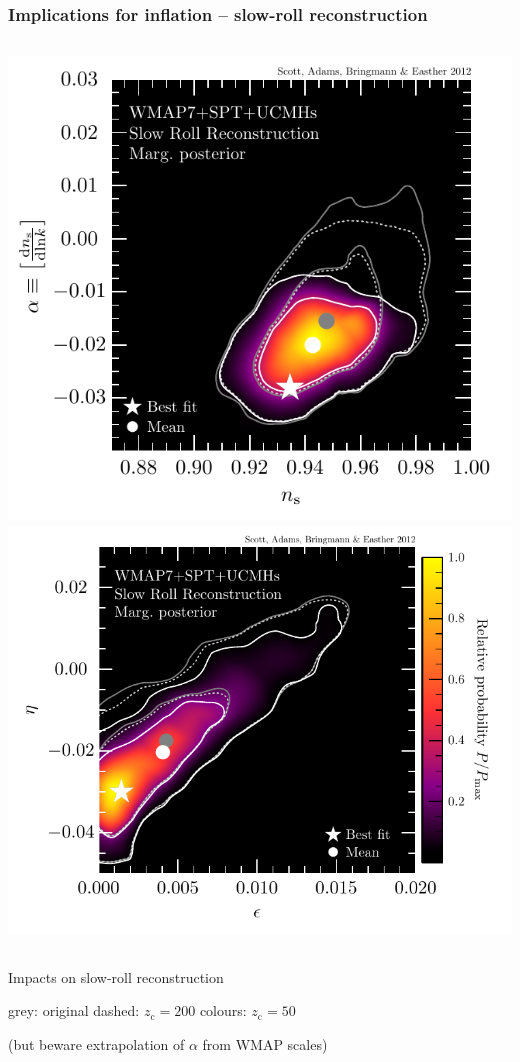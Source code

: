 \documentclass[xcolor=dvipsnames]{beamer}
\begin{document}
\begin{frame}
  \frametitle{Implications for inflation -- slow-roll reconstruction}

  \begin{columns}
    \includegraphics[height=0.9\columnwidth]{slowroll1}
    \includegraphics[height=0.9\columnwidth]{slowroll2}
  \end{columns}

  Impacts on slow-roll reconstruction

  grey: original\hspace{5mm} dashed: $z_\mathrm{c}=200$\hspace{5mm} colours: $z_\mathrm{c}=50$
  
  (but beware extrapolation of $\alpha$ from WMAP scales)

\end{frame}
\end{document}
